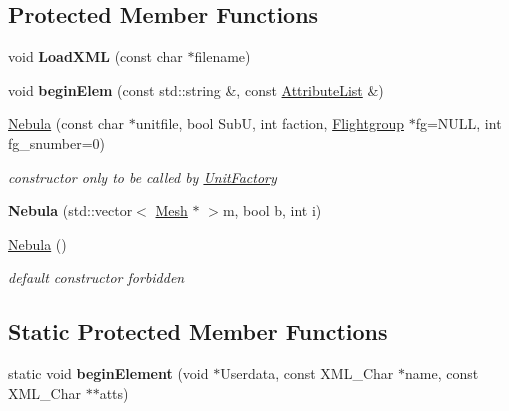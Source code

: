 \subsection*{Protected Member Functions}
\begin{DoxyCompactItemize}
\item 
void {\bfseries Load\+X\+ML} (const char $\ast$filename)\hypertarget{classNebula_a76562d35dbf793b9fe83d178b7f27960}{}\label{classNebula_a76562d35dbf793b9fe83d178b7f27960}

\item 
void {\bfseries begin\+Elem} (const std\+::string \&, const \hyperlink{classXMLSupport_1_1AttributeList}{Attribute\+List} \&)\hypertarget{classNebula_ab0ae0e68c84f219512814357c3b845c3}{}\label{classNebula_ab0ae0e68c84f219512814357c3b845c3}

\item 
\hyperlink{classNebula_a9fca2337ae93fbdc2005492af11a68f4}{Nebula} (const char $\ast$unitfile, bool SubU, int faction, \hyperlink{classFlightgroup}{Flightgroup} $\ast$fg=N\+U\+LL, int fg\+\_\+snumber=0)\hypertarget{classNebula_a9fca2337ae93fbdc2005492af11a68f4}{}\label{classNebula_a9fca2337ae93fbdc2005492af11a68f4}

\begin{DoxyCompactList}\small\item\em constructor only to be called by \hyperlink{classUnitFactory}{Unit\+Factory} \end{DoxyCompactList}\item 
{\bfseries Nebula} (std\+::vector$<$ \hyperlink{classMesh}{Mesh} $\ast$ $>$m, bool b, int i)\hypertarget{classNebula_ac6e682650aa2c2da119038e496249713}{}\label{classNebula_ac6e682650aa2c2da119038e496249713}

\item 
\hyperlink{classNebula_a4dfed5ca820798359340d6b4686b01ff}{Nebula} ()\hypertarget{classNebula_a4dfed5ca820798359340d6b4686b01ff}{}\label{classNebula_a4dfed5ca820798359340d6b4686b01ff}

\begin{DoxyCompactList}\small\item\em default constructor forbidden \end{DoxyCompactList}\end{DoxyCompactItemize}
\subsection*{Static Protected Member Functions}
\begin{DoxyCompactItemize}
\item 
static void {\bfseries begin\+Element} (void $\ast$Userdata, const X\+M\+L\+\_\+\+Char $\ast$name, const X\+M\+L\+\_\+\+Char $\ast$$\ast$atts)\hypertarget{classNebula_a31336e100794a9d42ebd7120a1c8b3fa}{}\label{classNebula_a31336e100794a9d42ebd7120a1c8b3fa}

\end{DoxyCompactItemize}
